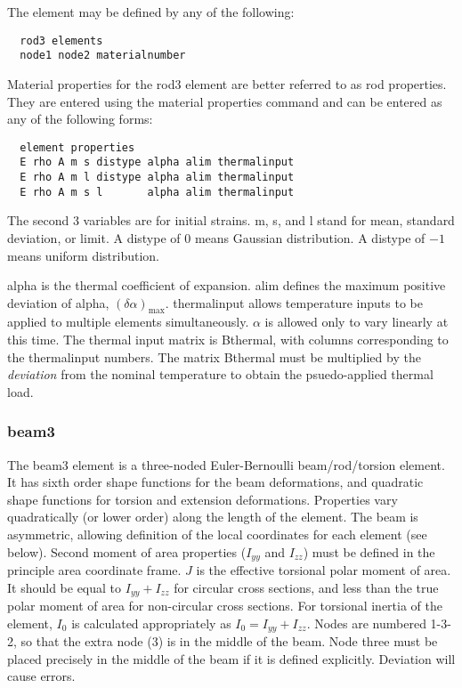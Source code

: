 \documentclass[12pt]{article}
\newcommand*{\command}[1]{\textsf{#1}}
\begin{document}
The element may be defined by any of the following:\\
\begin{lstlisting}
  rod3 elements
  node1 node2 materialnumber
\end{lstlisting}

Material properties for the \command{rod3} element  are better referred to as rod
properties. They are entered using the material properties command and
can be entered as any of the following forms:
\begin{lstlisting}
  element properties
  E rho A m s distype alpha alim thermalinput
  E rho A m l distype alpha alim thermalinput
  E rho A m s l       alpha alim thermalinput
\end{lstlisting}
The second 3 variables are for initial strains. \command{m}, \command{s}, and \command{l}
stand for mean, standard deviation, or limit. A \command{distype} of $0$
means Gaussian distribution. A \command{distype} of $-1$ means uniform distribution.

\command{alpha} is the thermal coefficient of expansion. \command{alim} defines the maximum positive deviation of \command{alpha}, $\left(\delta\alpha\right)_\text{max}$. \command{thermalinput} allows temperature inputs to be applied to multiple elements simultaneously. $\alpha$ is allowed only to vary linearly at this time.  The thermal input matrix is \command{Bthermal}, with columns corresponding to the \command{thermalinput} numbers. The matrix \command{Bthermal} must be multiplied by the \emph{deviation} from the nominal temperature to obtain the psuedo-applied thermal load.


\subsubsection{\command{beam3}}\label{el:beam3}
The \command{beam3} element is a three-noded Euler-Bernoulli beam/rod/torsion element. It has sixth order shape functions for the beam deformations, and quadratic shape functions for torsion and extension deformations. Properties vary quadratically (or lower order) along the length of the element. The beam is asymmetric, allowing definition of the local coordinates for each element (see below). Second moment of area properties ($I_{yy}$ and $I_{zz}$) must be defined in the principle area coordinate frame. $J$ is the effective torsional polar moment of area. It should be equal to $I_{yy}+I_{zz}$ for circular cross sections, and less than the true polar moment of area for non-circular cross sections. For torsional inertia of the element, $I_0$ is calculated appropriately as $I_0=I_{yy}+I_{zz}$. Nodes are numbered 1-3-2, so that the extra node (3) is in the middle of the beam. Node three must be placed precisely in the middle of the beam if it is defined explicitly. Deviation will cause errors.
\end{document}

